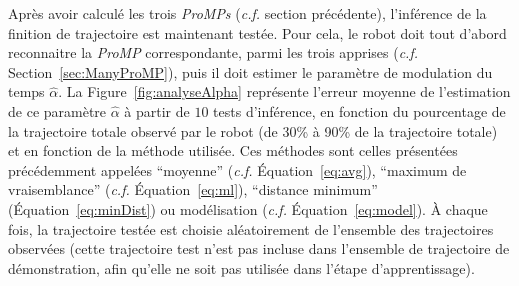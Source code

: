 \documentclass[utf8]{frontiersSCNS} %
\begin{document}
Après avoir calculé les trois \textit{ProMPs} (\textit{c.f.} section précédente), l'inférence de la finition de trajectoire est maintenant testée. Pour cela, le robot doit tout d'abord reconnaitre la \textit{ProMP} correspondante, parmi les trois apprises (\textit{c.f.} Section~\ref{sec:ManyProMP}), puis il doit estimer le paramètre de modulation du temps $\hat{\alpha}$.
La Figure~\ref{fig:analyseAlpha} représente l'erreur moyenne de l'estimation de ce paramètre $\hat{\alpha}$ à partir de $10$ tests d'inférence, en fonction du pourcentage de la trajectoire totale observé par le robot (de 30\% à 90\% de la trajectoire totale) et en fonction de la méthode utilisée. 
Ces méthodes sont celles présentées précédemment appelées ``moyenne'' (\textit{c.f.} Équation~\ref{eq:avg}), ``maximum de vraisemblance'' (\textit{c.f.} Équation~\ref{eq:ml}), ``distance minimum'' (Équation~\ref{eq:minDist}) ou modélisation (\textit{c.f.} Équation~\ref{eq:model}). 
À chaque fois, la trajectoire testée est choisie aléatoirement de l'ensemble des trajectoires observées (cette trajectoire test n'est pas incluse dans l'ensemble de trajectoire de démonstration, afin qu'elle ne soit pas utilisée dans l'étape d'apprentissage). 
\end{document}
